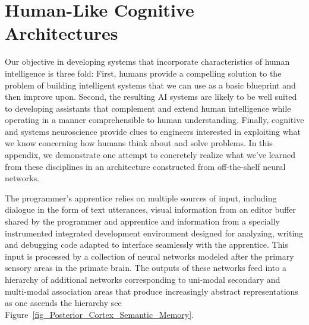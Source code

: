 
\section{Human-Like Cognitive Architectures}


Our objective in developing systems that incorporate characteristics of human intelligence is three fold: First, humans provide a compelling solution to the problem of building intelligent systems that we can use as a basic blueprint and then improve upon. Second, the resulting AI systems are likely to be well suited to developing assistants that complement and extend human intelligence while operating in a manner comprehensible to human understanding. Finally, cognitive and systems neuroscience provide clues to engineers interested in exploiting what we know concerning how humans think about and solve problems. In this appendix, we demonstrate one attempt to concretely realize what we've learned from these disciplines in an architecture constructed from off-the-shelf neural networks. 

The programmer's apprentice relies on multiple sources of input, including dialogue in the form of text utterances, visual information from an editor buffer shared by the programmer and apprentice and information from a specially instrumented integrated development environment designed for analyzing, writing and debugging code adapted to interface seamlessly with the apprentice. This input is processed by a collection of neural networks modeled after the primary sensory areas in the primate brain. The outputs of these networks feed into a hierarchy of additional networks corresponding to uni-modal secondary and multi-modal association areas that produce increasingly abstract representations as one ascends the hierarchy \emdash{} see Figure~\ref{fig_Posterior_Cortex_Semantic_Memory}.
  


